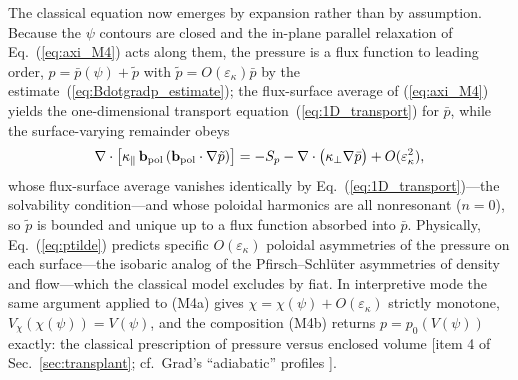 \documentclass[english]{article}
\newcommand{\bb}{\mathbf{b}}
\begin{document}
The classical equation now emerges by expansion rather than by assumption. Because the $\psi$
contours are closed and the in-plane parallel relaxation of Eq.~(\ref{eq:axi_M4}) acts along them,
the pressure is a flux function to leading order, $p=\bar p(\psi)+\tilde p$ with
$\tilde p=O(\varepsilon_\kappa)\bar p$ by the estimate~(\ref{eq:Bdotgradp_estimate}); the
flux-surface average of (\ref{eq:axi_M4}) yields the one-dimensional transport
equation~(\ref{eq:1D_transport}) for $\bar p$, while the surface-varying remainder obeys
\begin{equation}
\nabla\cdot\big[\kappa_\parallel\,\bb_{\rm pol}\,(\bb_{\rm pol}\cdot\nabla\tilde p)\big]
=-S_p-\nabla\cdot\big(\kappa_\perp\nabla\bar p\big)+O(\varepsilon_\kappa^{2}) ,
\label{eq:ptilde}
\end{equation}
whose flux-surface average vanishes identically by Eq.~(\ref{eq:1D_transport})---the solvability
condition---and whose poloidal harmonics are all nonresonant ($n=0$), so $\tilde p$ is bounded and
unique up to a flux function absorbed into $\bar p$. Physically, Eq.~(\ref{eq:ptilde}) predicts
specific $O(\varepsilon_\kappa)$ poloidal asymmetries of the pressure on each surface---the
isobaric analog of the Pfirsch--Schl\"uter asymmetries of density and flow---which the classical
model excludes by fiat. In interpretive mode the same argument applied to (M4a) gives
$\chi=\chi(\psi)+O(\varepsilon_\kappa)$ strictly monotone, $V_\chi(\chi(\psi))=V(\psi)$, and the
composition (M4b) returns $p=p_0(V(\psi))$ exactly: the classical prescription of pressure versus
enclosed volume [item 4 of Sec.~\ref{sec:transplant}; cf.\ Grad's ``adiabatic'' profiles
\cite{grad1975}].
\end{document}

